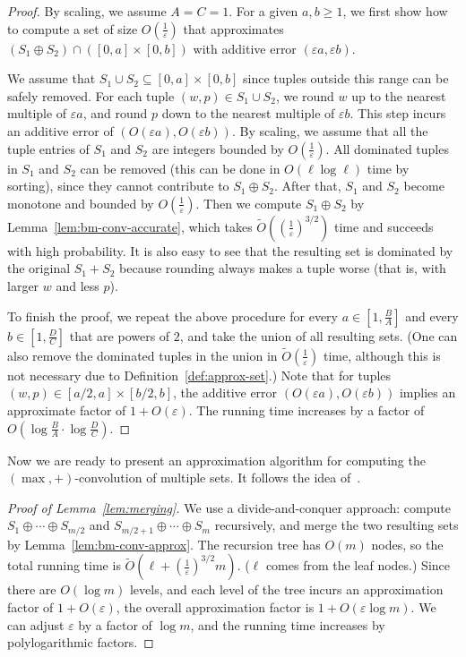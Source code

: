\documentclass[a4paper,UKenglish,cleveref, autoref, thm-restate, pdfa]{lipics-v2021}
\newcommand{\eps}{\varepsilon}
\renewcommand{\geq}{\geqslant}
\begin{document}
\begin{proof}
    By scaling, we assume $A = C = 1$.  For a given $a, b \geq 1$, we first show how to compute a set of size $O(\frac{1}{\eps})$ that approximates $(S_1 \oplus S_2) \cap ([0,a] \times [0,b])$ with additive error $(\eps a, \eps b)$. 

    We assume that $S_1 \cup S_2 \subseteq [0,a]\times [0,b]$ since tuples outside this range can be safely removed.  For each tuple $(w,p) \in S_1 \cup S_2$, we round $w$ up to the nearest multiple of $\eps a$, and round $p$ down to the nearest multiple of $\eps b$. This step incurs an additive error of $(O(\eps a), O(\eps b))$. By scaling, we assume that all the tuple entries of $S_1$ and $S_2$ are integers bounded by $O(\frac{1}{\eps})$. All dominated tuples in $S_1$ and $S_2$ can be removed (this can be done in $O(\ell\log \ell)$ time by sorting), since they cannot contribute to $S_1 \oplus S_2$. After that, $S_1$ and $S_2$ become monotone and bounded by $O(\frac{1}{\eps})$. Then we compute $S_1 \oplus S_2$ by Lemma~\ref{lem:bm-conv-accurate}, which takes $\tilde{O}((\frac{1}{\eps})^{3/2})$ time and succeeds with high probability. It is also easy to see that the resulting set is dominated by the original $S_1 + S_2$ because rounding always makes a tuple worse (that is, with larger $w$ and less $p$).

    To finish the proof, we repeat the above procedure for every $a \in [1, \frac{B}{A}]$ and every $b \in [1, \frac{D}{C}]$ that are powers of $2$, and take the union of all resulting sets. (One can also remove the dominated tuples in the union in $\tilde{O}(\frac{1}{\eps})$ time, although this is not necessary due to Definition~\ref{def:approx-set}.) Note that for tuples $(w, p) \in [a/2, a]\times [b/2, b]$, the additive error $(O(\eps a), O(\eps b))$ implies an approximate factor of $1 + O(\eps)$. The running time increases by a factor of $O(\log \frac{B}{A} \cdot \log \frac{D}{C})$.
\end{proof}

Now we are ready to present an approximation algorithm for computing the $(\max,+)$-convolution of multiple sets. It follows the idea of~\cite[Lemma 2(i)]{Chan18}.
\begin{proof}[Proof of Lemma~\ref{lem:merging}]
    We use a divide-and-conquer approach:  compute $S_1 \oplus \cdots \oplus S_{m/2}$ and $S_{m/2+1} \oplus \cdots \oplus S_{m}$ recursively, and merge the two resulting sets by Lemma~\ref{lem:bm-conv-approx}. The recursion tree has $O(m)$ nodes, so the total running time is $\tilde{O}(\ell + (\frac{1}{\eps})^{3/2}m)$. ($\ell$ comes from the leaf nodes.) Since there are $O(\log m)$ levels, and each level of the tree incurs an approximation factor of $1 + O(\eps)$, the overall approximation factor is $1 + O(\eps \log m)$. We can adjust $\eps$ by a factor of $\log m$, and the running time increases by polylogarithmic factors.
\end{proof}
\end{document}
